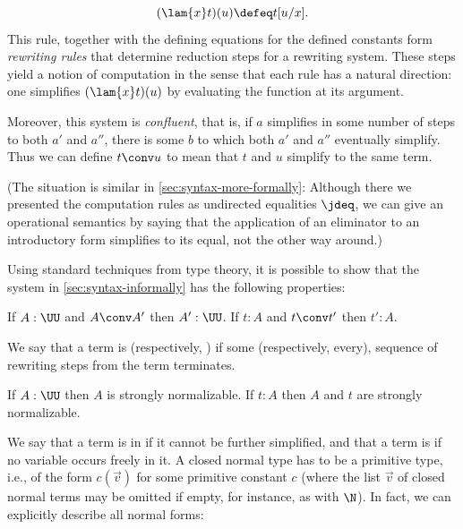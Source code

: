 \[
  (\lam{x} t)(u) \defeq t[u/x].
\]
This rule, together with the defining equations for the defined constants form
\emph{rewriting rules} that determine reduction steps for a rewriting 
system. These steps yield a notion of computation in the sense that each rule
has a natural direction: one simplifies $(\lam{x} t)(u)$ by evaluating the
function at its argument.

Moreover, this system is \emph{confluent}, that is, if $a$ simplifies in some
number of steps to both $a'$ and $a''$, there is some $b$ to which both $a'$ and
$a''$ eventually simplify. Thus we can define $t\conv u$ to mean that $t$ and
$u$ simplify to the same term.

(The situation is similar in \cref{sec:syntax-more-formally}: Although there
we presented the computation rules as undirected equalities $\jdeq$, we can give
an operational semantics by saying that the application of an eliminator to an
introductory form simplifies to its equal, not the other way around.)

Using standard techniques from type theory, it is possible to show that the system in \cref{sec:syntax-informally}
has the following properties:

\begin{thm}\label{thm:conversion-preserves-typing}
If $A : \UU$ and $A \conv A'$ then $A' : \UU$.
If $t:A$ and $t \conv t'$ then $t':A$.
\end{thm}

We say that a term is 
%
%
%
(respectively, )
%
%
%
if some (respectively, every), sequence of rewriting steps from the term
terminates.

\begin{thm}\label{thm:strong-normalization}
If $A : \UU$ then $A$ is strongly normalizable.
If $t:A$ then $A$ and $t$ are strongly normalizable.
\end{thm}

We say that a term is in 
%
%
if it cannot be further
simplified, and that a term is 
%
%
if no variable occurs freely in
it. A closed normal type has to be a primitive type, i.e., of the form
$c(\vec{v})$ for some primitive constant $c$ (where the list $\vec{v}$ of closed
normal terms may be omitted if empty, for instance, as with $\N$). In fact, we
can explicitly describe all normal forms:

